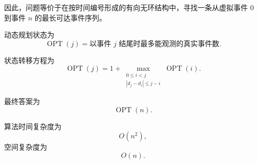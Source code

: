 \documentclass[12pt,a4paper]{article}
\begin{document}
\begin{answerbox}
因此，问题等价于在按时间编号形成的有向无环结构中，寻找一条从虚拟事件 $0$ 到事件 $n$ 的最长可达事件序列。

动态规划状态为
\[
\operatorname{OPT}(j)
=
\text{以事件 }j\text{ 结尾时最多能观测的真实事件数}.
\]

状态转移方程为
\[
\operatorname{OPT}(j)
=
1+
\max_{\substack{0\le i<j\\ |d_j-d_i|\le j-i}}
\operatorname{OPT}(i).
\]

最终答案为
\[
\operatorname{OPT}(n).
\]

算法时间复杂度为
\[
O(n^2),
\]
空间复杂度为
\[
O(n).
\]


\end{answerbox}
\end{document}
